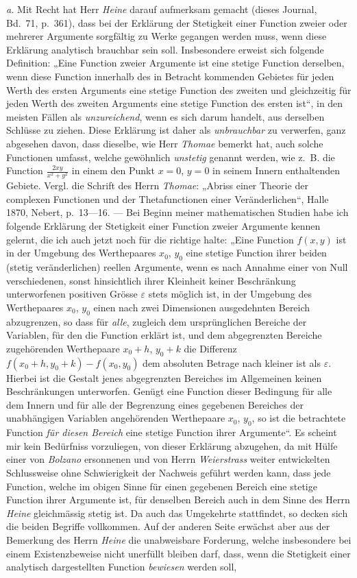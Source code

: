 \documentclass{article}
\begin{document}
\emph{a.} Mit Recht hat Herr \emph{Heine} darauf aufmerksam gemacht (dieses Journal, Bd.~71, p.~361), dass bei der Erklärung der Stetigkeit einer Function zweier oder mehrerer Argumente sorgfältig zu Werke gegangen werden muss, wenn diese Erklärung analytisch brauchbar sein soll. Insbesondere erweist sich folgende Definition: „Eine Function zweier Argumente ist eine stetige Function derselben, wenn diese Function innerhalb des in Betracht kommenden Gebietes für jeden Werth des ersten Arguments eine stetige Function des zweiten und gleichzeitig für jeden Werth des zweiten Arguments eine stetige Function des ersten ist“, in den meisten Fällen als \emph{unzureichend}, wenn es sich darum handelt, aus derselben Schlüsse zu ziehen. Diese Erklärung ist daher als \emph{unbrauchbar} zu verwerfen, ganz abgesehen davon, dass dieselbe, wie Herr \emph{Thomae} bemerkt hat, auch solche Functionen umfasst, welche gewöhnlich \emph{unstetig} genannt werden, wie z.~B. die Function $\frac{2xy}{x^2+y^2}$ in einem den Punkt $x=0$, $y=0$ in seinem Innern enthaltenden Gebiete. Vergl. die Schrift des Herrn \emph{Thomae}: „Abriss einer Theorie der complexen Functionen und der Thetafunctionen einer Veränderlichen“, Halle 1870, Nebert, p.~13---16. --- Bei Beginn meiner mathematischen Studien habe ich folgende Erklärung der Stetigkeit einer Function zweier Argumente kennen gelernt, die ich auch jetzt noch für die richtige halte: „Eine Function $f(x, y)$ ist in der Umgebung des Werthepaares $x_0$, $y_0$ eine stetige Function ihrer beiden (stetig veränderlichen) reellen Argumente, wenn es nach Annahme einer von Null verschiedenen, sonst hinsichtlich ihrer Kleinheit keiner Beschränkung unterworfenen positiven Grösse $\varepsilon$ stets möglich ist, in der Umgebung des Werthepaares $x_0$, $y_0$ einen nach zwei Dimensionen ausgedehnten Bereich abzugrenzen, so dass für \emph{alle}, zugleich dem ursprünglichen Bereiche der Variablen, für den die Function erklärt ist, und dem abgegrenzten Bereiche zugehörenden Werthepaare $x_0 + h$, $y_0 + k$ die Differenz $f(x_0 + h, y_0 + k) - f(x_0, y_0)$ dem absoluten Betrage nach kleiner ist als $\varepsilon$. Hierbei ist die Gestalt jenes abgegrenzten Bereiches im Allgemeinen keinen Beschränkungen unterworfen. Genügt eine Function dieser Bedingung für alle dem Innern und für alle der Begrenzung eines gegebenen Bereiches der unabhängigen Variablen angehörenden Werthepaare $x_0$, $y_0$, so ist die betrachtete Function \emph{für diesen Bereich} eine stetige Function ihrer Argumente“. Es scheint mir kein Bedürfniss vorzuliegen, von dieser Erklärung abzugehen, da mit Hülfe einer von \emph{Bolzano} ersonnenen und von Herrn \emph{Weierstrass} weiter entwickelten Schlussweise ohne Schwierigkeit der Nachweis geführt werden kann, dass jede Function, welche im obigen Sinne für einen gegebenen Bereich eine stetige Function ihrer Argumente ist, für denselben Bereich auch in dem Sinne des Herrn \emph{Heine} gleichmässig stetig ist. Da auch das Umgekehrte stattfindet, so decken sich die beiden Begriffe vollkommen. Auf der anderen Seite erwächst aber aus der Bemerkung des Herrn \emph{Heine} die unabweisbare Forderung, welche insbesondere bei einem Existenzbeweise nicht unerfüllt bleiben darf, dass, wenn die Stetigkeit einer analytisch dargestellten Function \emph{bewiesen} werden soll, 
\end{document}
